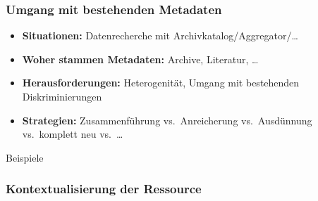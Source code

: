 \documentclass[
  letterpaper,
  DIV=11,
  numbers=noendperiod]{scrartcl}
\providecommand{\tightlist}{%
  \setlength{\itemsep}{0pt}\setlength{\parskip}{0pt}}\usepackage{longtable,booktabs,array}
\begin{document}
\subsubsection{Umgang mit bestehenden
Metadaten}\label{umgang-mit-bestehenden-metadaten}

\begin{itemize}
\tightlist
\item
  \textbf{Situationen:} Datenrecherche mit
  Archivkatalog/Aggregator/\ldots{}
\item
  \textbf{Woher stammen Metadaten:} Archive, Literatur, \ldots{}
\item
  \textbf{Herausforderungen:} Heterogenität, Umgang mit bestehenden
  Diskriminierungen
\item
  \textbf{Strategien:} Zusammenführung vs.~Anreicherung vs.~Ausdünnung
  vs.~komplett neu vs.~\ldots{}
\end{itemize}

\begin{tcolorbox}[enhanced jigsaw, colbacktitle=quarto-callout-tip-color!10!white, rightrule=.15mm, coltitle=black, left=2mm, opacitybacktitle=0.6, toptitle=1mm, title=\textcolor{quarto-callout-tip-color}{\faLightbulb}\hspace{0.5em}{Erfahrungen von Stadt.Geschichte.Basel}, colback=white, colframe=quarto-callout-tip-color-frame, opacityback=0, titlerule=0mm, leftrule=.75mm, breakable, bottomtitle=1mm, bottomrule=.15mm, arc=.35mm, toprule=.15mm]

Beispiele

\end{tcolorbox}

\subsubsection{Kontextualisierung der
Ressource}\label{kontextualisierung-der-ressource}
\end{document}
